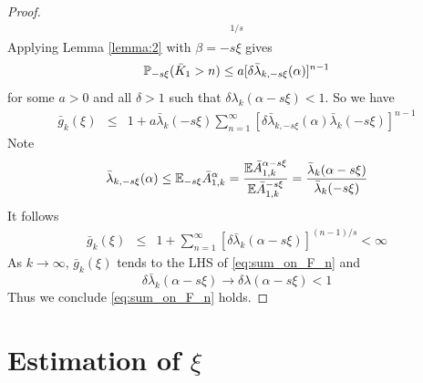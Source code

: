 \documentclass[aoas,preprint]{imsart}
\numberwithin{equation}{section}
\theoremstyle{plain}
\begin{document}
\begin{proof}
\begin{eqnarray*}
    [\P_{-s\xi}(n \leq \bar T_u < \bar K_1)]^{1/s}
  \end{eqnarray*}
  Applying Lemma \ref{lemma:2} with $\beta = -s\xi$ gives
  \begin{eqnarray*}
    \P_{-s\xi}(\bar K_1 > n) \leq a [\delta \bar \lambda_{k, -s\xi}(\alpha)]^{n-1}
  \end{eqnarray*}
  for some $a > 0$ and all $\delta > 1$ such that
  $\delta \lambda_k(\alpha - s\xi) < 1$. So we have
  \begin{eqnarray*}
    \bar g_k(\xi) &\leq& 1 + a \bar \lambda_k(-s\xi)\sum_{n=1}^\infty
    [\delta \bar \lambda_{k, -s\xi}(\alpha) \bar \lambda_k(-s\xi)]^{n-1} 
  \end{eqnarray*}
  Note
  \begin{eqnarray*}
    \bar \lambda_{k, -s\xi}(\alpha)
    \leq
    \E_{-s\xi} \bar A_{1,k}^\alpha 
    = {
      \E \bar A_{1,k}^{\alpha - s\xi}
      \over
      \E \bar A_{1,k}^{-s\xi}
    }
    = {
      \bar \lambda_k(\alpha - s\xi)
      \over
      \bar \lambda_k(-s\xi)
    }
  \end{eqnarray*}
  It follows
  \begin{eqnarray*}
    \bar g_k(\xi) &\leq& 1 + \sum_{n=1}^\infty
    [\delta \bar \lambda_k(\alpha - s\xi)]^{(n-1)/s}
    < \infty
  \end{eqnarray*}
  As $k \to \infty$, $\bar g_k(\xi)$ tends to the LHS of
  \eqref{eq:sum_on_F_n} and
  \[
  \delta \bar \lambda_k(\alpha - s\xi) \to \delta \lambda(\alpha - s\xi)
  < 1
  \]
  Thus we conclude \eqref{eq:sum_on_F_n} holds.
\end{proof}

\section[Estimation of xi]{Estimation of $\xi$}
\end{document}

